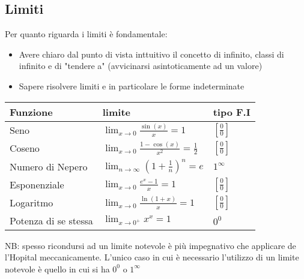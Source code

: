 \renewcommand{\arraystretch}{1}
\subsection{Limiti}
Per quanto riguarda i limiti è fondamentale:
\begin{itemize}
	\item Avere chiaro dal punto di vista inttuitivo il concetto di infinito, classi di infinito e di "tendere a" (avvicinarsi asintoticamente ad un valore)
	\item Sapere risolvere limiti e in particolare le forme indeterminate
\end{itemize}

\renewcommand{\arraystretch}{1.4}
\begin{center}
	\begin{tabular}{l l l}
		\hline
		Funzione             & limite                                                     & tipo F.I          \\
		\hline
		Seno                 & $ \lim_{x \to 0} \frac{\sin(x)}{x} = 1 $                   & $ [\frac{0}{0}] $ \\
		Coseno               & $ \lim_{x \to 0} \frac{1-\cos(x)}{x^2} = \frac{1}{2} $     & $ [\frac{0}{0}] $ \\
		Numero di Nepero     & $ \lim_{n \to \infty} \left(1 + \frac{1}{n}\right)^n = e $ & $ 1^{\infty } $   \\
		Esponenziale         & $ \lim_{x \to 0} \frac{e^x - 1}{x} = 1 $                   & $ [\frac{0}{0}] $ \\
		Logaritmo            & $ \lim_{x \to 0} \frac{\ln(1+x)}{x} = 1 $                  & $ [\frac{0}{0}] $ \\
		Potenza di se stessa & $ \lim_{x \to 0^+} x^x = 1 $                               & $ 0^{0} $         \\
		\hline
	\end{tabular}
\end{center}
\renewcommand{\arraystretch}{1}
NB: spesso ricondursi ad un limite notevole è più impegnativo che applicare de l'Hopital meccanicamente. L'unico caso in cui è necessario l'utilizzo di un limite notevole è quello in cui si ha $ 0^{0} $ o $ 1^{\infty } $

